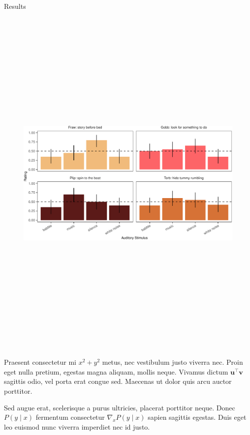 \documentclass[final]{beamer}
\newlength{\colwidth}
\begin{document}
\begin{frame}[t]
\begin{columns}[t]
\begin{column}{\colwidth}
\begin{block}{Results}
    \begin{figure}
      \includegraphics[width = 14in, height = 7in]{../writeup/figs/e4b-bar-1.pdf}
    \end{figure}


    Praesent consectetur mi $x^2 + y^2$ metus, nec vestibulum justo viverra
    nec. Proin eget nulla pretium, egestas magna aliquam, mollis neque. Vivamus
    dictum $\mathbf{u}^\intercal\mathbf{v}$ sagittis odio, vel porta erat
    congue sed. Maecenas ut dolor quis arcu auctor porttitor.


    Sed augue erat, scelerisque a purus ultricies, placerat porttitor neque.
    Donec $P(y \mid x)$ fermentum consectetur $\nabla_x P(y \mid x)$ sapien
    sagittis egestas. Duis eget leo euismod nunc viverra imperdiet nec id
    justo.


\end{block}
\end{column}
\end{columns}
\end{frame}
\end{document}
